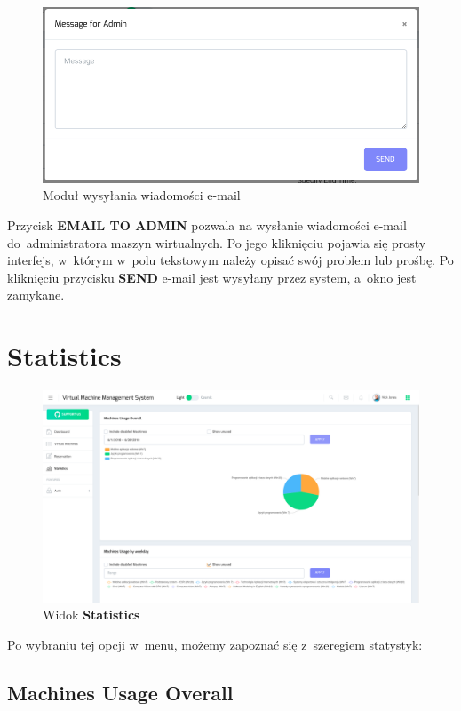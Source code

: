 \documentclass[a5paper, twoside, openany]{book}
\begin{document}
  \begin{figure}[H]
    \centerline{\includegraphics[width=0.9 \textwidth]{email}}
    \caption{Moduł wysyłania wiadomości e-mail}
  \end{figure}

  Przycisk \textbf{EMAIL TO ADMIN} pozwala na wysłanie wiadomości e-mail do~administratora maszyn wirtualnych. Po jego kliknięciu pojawia się prosty interfejs, w~którym w~polu tekstowym należy opisać swój problem lub prośbę. Po kliknięciu przycisku \textbf{SEND} e-mail jest wysyłany przez system, a~okno jest zamykane.

  \section{Statistics}

  \begin{figure}[H]
    \centerline{\includegraphics[width=0.9 \textwidth]{statistics}}
    \caption{Widok \textbf{Statistics}}
  \end{figure}

  Po wybraniu tej opcji w~menu, możemy zapoznać się z~szeregiem statystyk:

  \subsection{Machines Usage Overall}
  \label{MachinesUsageOverall}
\end{document}

